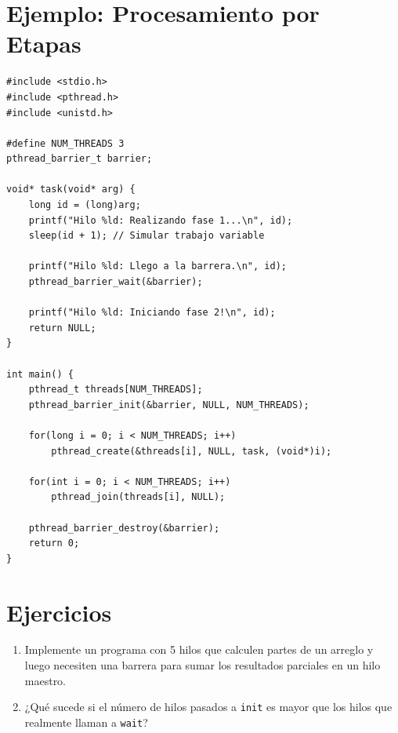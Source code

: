 \documentclass[12pt,a4paper]{article}
\begin{document}
\section{Ejemplo: Procesamiento por Etapas}
\begin{lstlisting}
#include <stdio.h>
#include <pthread.h>
#include <unistd.h>

#define NUM_THREADS 3
pthread_barrier_t barrier;

void* task(void* arg) {
    long id = (long)arg;
    printf("Hilo %ld: Realizando fase 1...\n", id);
    sleep(id + 1); // Simular trabajo variable

    printf("Hilo %ld: Llego a la barrera.\n", id);
    pthread_barrier_wait(&barrier);

    printf("Hilo %ld: Iniciando fase 2!\n", id);
    return NULL;
}

int main() {
    pthread_t threads[NUM_THREADS];
    pthread_barrier_init(&barrier, NULL, NUM_THREADS);

    for(long i = 0; i < NUM_THREADS; i++)
        pthread_create(&threads[i], NULL, task, (void*)i);

    for(int i = 0; i < NUM_THREADS; i++)
        pthread_join(threads[i], NULL);

    pthread_barrier_destroy(&barrier);
    return 0;
}
\end{lstlisting}

\section{Ejercicios}
\begin{enumerate}
    \item Implemente un programa con 5 hilos que calculen partes de un arreglo y luego necesiten una barrera para sumar los resultados parciales en un hilo maestro.
    \item ¿Qué sucede si el número de hilos pasados a \texttt{init} es mayor que los hilos que realmente llaman a \texttt{wait}?
\end{enumerate}
\end{document}
